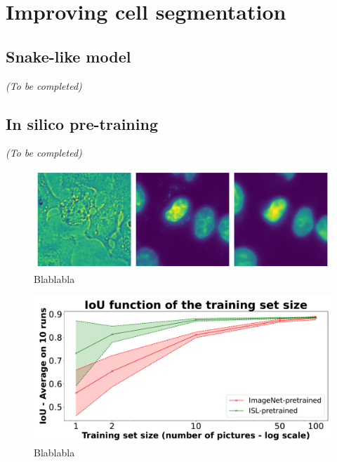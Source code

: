 \section{Improving cell segmentation}
\label{sec:segmentation_improvements}

\subsection{Snake-like model}
\label{subsec:segmentation_snake}

\begin{center}
	\textit{(To be completed)}
\end{center}


\subsection{In silico pre-training}
\label{subsec:segmentation_insilico}

\begin{center}
	\textit{(To be completed)}
\end{center}

\begin{figure}[]
    \centering
    \includegraphics[width=\textwidth]{figures/chapter3/insilico_prediction}
    \caption[Blablabla]{Blablabla}
    \label{fig:blabla}
\end{figure}

\begin{figure}[]
    \centering
    \includegraphics[width=\textwidth]{figures/chapter3/insilico_training_size}
    \caption[Blablabla]{Blablabla}
    \label{fig:blablabla}
\end{figure}

